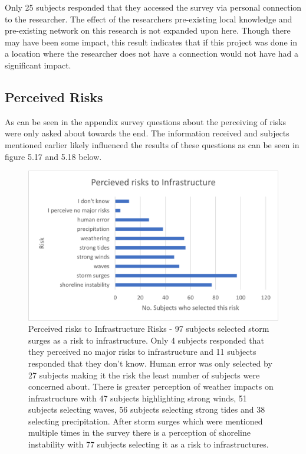 Only 25 subjects responded that they accessed the survey via personal connection to the researcher. The effect of the researchers pre-existing local knowledge and pre-existing network on this research is not expanded upon here. Though there may have been some impact, this result indicates that if this project was done in a location where the researcher does not have a connection would not have had a significant impact. 

\subsection{Perceived Risks}
As can be seen in the appendix survey questions about the perceiving of risks were only asked about towards the end. The information received and subjects mentioned earlier likely influenced the results of these questions as can be seen in figure 5.17 and 5.18 below.

\begin{figure}[h!]
    \centering
    \includegraphics{fig_results/infrastructure-risks.png}
    \caption{Perceived risks to Infrastructure Risks - 97 subjects selected storm surges as a risk to infrastructure. Only 4 subjects responded that they perceived no major risks to infrastructure and 11 subjects responded that they don't know. Human error was only selected by 27 subjects making it the risk the least number of subjects were concerned about. There is greater perception of weather impacts on infrastructure with 47 subjects highlighting strong winds, 51 subjects selecting waves, 56 subjects selecting strong tides and 38 selecting precipitation. After storm surges which were mentioned multiple times in the survey there is a perception of shoreline instability with 77 subjects selecting it as a risk to infrastructures.   }
    \label{fig:my_label}
\end{figure}
